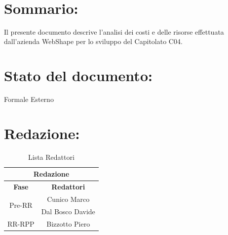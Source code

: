 \begin{center} %
	\begin{Huge}	
				\textbf{\TITOLODOC}
			\\
	\end{Huge}
\end{center}

\section*{\LARGE Sommario:}
Il presente documento descrive l'analisi dei costi e delle risorse effettuata dall'azienda WebShape per lo sviluppo del Capitolato C04.

\indent \indent

\section*{\LARGE Stato del documento:}
\indent \indent
	Formale Esterno

\section*{\LARGE Redazione:}
	\begin{table}[!h]
		\begin{center}
			\begin{tabular}
				{|c|c|}
				\hline
				\multicolumn{2}{|c|}{ \textbf{Redazione} } \\
				\hline
				\textbf{Fase} & \textbf{Redattori} \\
				\hline
				\multirow{2}{*}{Pre-RR} & Cunico Marco\\
										& Dal Bosco Davide\\
				\hline
				\multirow{1}{*}{RR-RPP} & Bizzotto Piero\\
										
				\hline
			\end{tabular}
			\caption{Lista Redattori} %
			\label{tabredazione}
		\end{center}
	\end{table}
	
